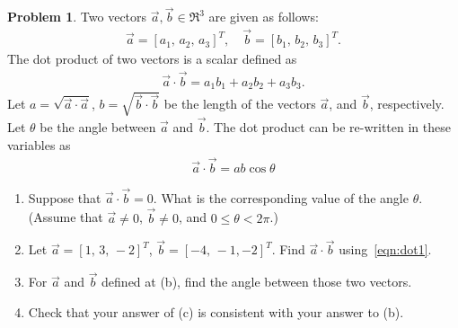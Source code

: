 \documentclass[10pt]{article}
\theoremstyle{definition}
\newtheorem{prob}{Problem}[section]
\newenvironment{subprob}%
{\renewcommand{\theenumi}{\alph{enumi}}\renewcommand{\labelenumi}{(\theenumi)}\begin{enumerate}}%
{\end{enumerate}}%
\begin{document}
\begin{prob}
Two vectors $\vec a,\vec b\in\Re^3$ are given as follows:
\begin{align*}
\vec a = [a_1,\,a_2,\, a_3]^T,\quad \vec b = [b_1,\,b_2,\, b_3]^T.
\end{align*}
The dot product of two vectors is a scalar defined as
\begin{align}
\vec a \cdot \vec b = a_1b_1+a_2b_2+a_3b_3.\label{eqn:dot1}
\end{align}
Let $a=\sqrt{\vec a \cdot \vec a}$,\; $b=\sqrt{\vec b \cdot \vec b}$\; be the length of the vectors $\vec a$, and $\vec b$, respectively. Let $\theta$ be the angle between $\vec a$ and $\vec b$. The dot product can be re-written in these variables as
\begin{align}
\vec a \cdot \vec b = a b \cos\theta
\end{align}

\begin{subprob}
\item Suppose that $\vec a\cdot\vec b =0$. What is the corresponding value of the angle $\theta$. (Assume that $\vec a\neq 0$, $\vec b\neq 0$, and $0\leq\theta < 2 \pi$.)
\item Let $\vec a = [1,\,3,\,-2]^T$, $\vec b =[-4,\,-1,-2]^T$. Find $\vec a \cdot \vec b$ using~\cref{eqn:dot1}.
\item For $\vec a$ and $\vec b$ defined at (b), find the angle between those two vectors.
\item Check that your answer of (c) is consistent with your answer to (b).
\end{subprob}


\end{prob}
\end{document}
